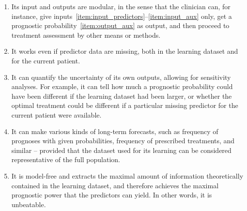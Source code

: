 \documentclass[a4paper,12pt,%
onecolumn,oneside,article,%
british%
]{memoir}
\theoremstyle{remark}
\theoremstyle{innote}
\renewcommand*{\|}[1][]{\nonscript\:#1\vert\nonscript\:\mathopen{}}
\begin{document}
\begin{enumerate}[label=\arabic*.]
\item\label{item:feat_modular_inout} Its input and outputs are modular, in the sense that the clinician can, for instance, give inputs~\ref{item:input_predictors}--\ref{item:input_aux} only, get a prognostic probability~\ref{item:output_aux} as output, and then proceed to treatment assessment by other means or methods.

\item\label{item:feat_imputation} It works even if predictor data are missing, both in the learning dataset and for the current patient.

\item\label{item:feat_uncertainty} It can quantify the uncertainty of its own outputs, allowing for sensitivity analyses. For example, it can tell how much a prognostic probability could have been different if the learning dataset had been larger, or whether the optimal treatment could be different if a particular missing predictor for the current patient were available.

\item\label{item:feat_forecast} It can make various kinds of long-term forecasts, such as frequency of prognoses with given probabilities, frequency of prescribed treatments, and similar -- provided that the dataset used for its learning can be considered representative of the full population.

\item\label{item:feat_unbeatable} It is model-free and extracts the maximal amount of information theoretically contained in the learning dataset, and therefore achieves the maximal prognostic power that the predictors can yield. In other words, it is unbeatable.

\end{enumerate}
\end{document}
